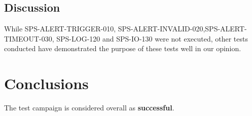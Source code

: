 \subsection{Discussion}

While SPS-ALERT-TRIGGER-010, SPS-ALERT-INVALID-020,SPS-ALERT-TIMEOUT-030, SPS-LOG-120 and SPS-IO-130 were not executed,
other tests conducted have demonstrated the purpose of these tests well in our opinion.

\section{Conclusions}

The test campaign is considered overall as {\bf successful}.